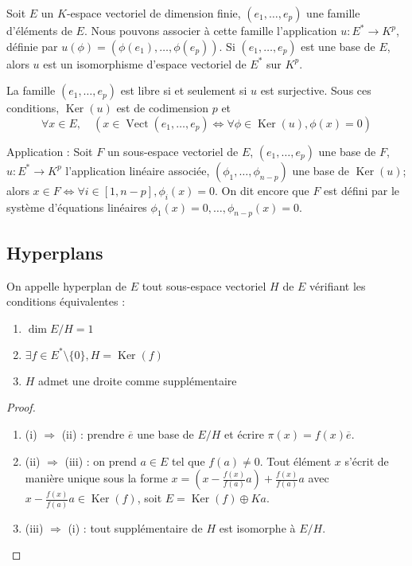 \begin{prop}
Soit $E$ un $K$-espace vectoriel de dimension finie, $(e_1,\ldots,e_p)$ une famille d'éléments de $E$. Nous pouvons associer à cette famille l'application $u : E^* \to K^p$, définie par $u(\phi) = (\phi(e_1),\ldots,\phi(e_p))$. Si $(e_1,\ldots,e_p)$ est une base de $E$, alors $u$ est un isomorphisme d'espace vectoriel de $E^*$ sur $K^p$.
\end{prop}

\begin{prop}
La famille $(e_1,\ldots,e_p)$ est libre si et seulement si $u$ est surjective. Sous ces conditions, $\operatorname{Ker}(u)$ est de codimension $p$ et
\[ \forall x \in E, \quad (x \in \operatorname{Vect}(e_1,\ldots,e_p) \Leftrightarrow \forall \phi \in \operatorname{Ker}(u), \phi(x) = 0) \]
\end{prop}

\begin{rem}
Application : Soit $F$ un sous-espace vectoriel de $E$, $(e_1,\ldots,e_p)$ une base de $F$, $u : E^* \to K^p$ l'application linéaire associée, $(\phi_1,\ldots,\phi_{n-p})$ une base de $\operatorname{Ker}(u)$; alors $x \in F \Leftrightarrow \forall i \in [1,n-p], \phi_i(x) = 0$. On dit encore que $F$ est défini par le système d'équations linéaires $\phi_1(x) = 0,\ldots,\phi_{n-p}(x) = 0$.
\end{rem}

\subsection{Hyperplans}

\begin{de}
On appelle hyperplan de $E$ tout sous-espace vectoriel $H$ de $E$ vérifiant les conditions équivalentes :
\begin{enumerate}
\item $\dim E/H = 1$
\item $\exists f \in E^* \setminus \{0\}, H = \operatorname{Ker}(f)$
\item $H$ admet une droite comme supplémentaire
\end{enumerate}
\end{de}

\begin{proof}
\begin{enumerate}
\item (i) $\Rightarrow$ (ii) : prendre $\overline{e}$ une base de $E/H$ et écrire $\pi(x) = f(x)\overline{e}$.
\item (ii) $\Rightarrow$ (iii) : on prend $a \in E$ tel que $f(a)\neq 0$. Tout élément $x$ s'écrit de manière unique sous la forme $x = (x - \frac{f(x)}{f(a)}a) + \frac{f(x)}{f(a)}a$ avec $x - \frac{f(x)}{f(a)}a \in \operatorname{Ker}(f)$, soit $E = \operatorname{Ker}(f) \oplus Ka$.
\item (iii) $\Rightarrow$ (i) : tout supplémentaire de $H$ est isomorphe à $E/H$.
\end{enumerate}
\end{proof}


